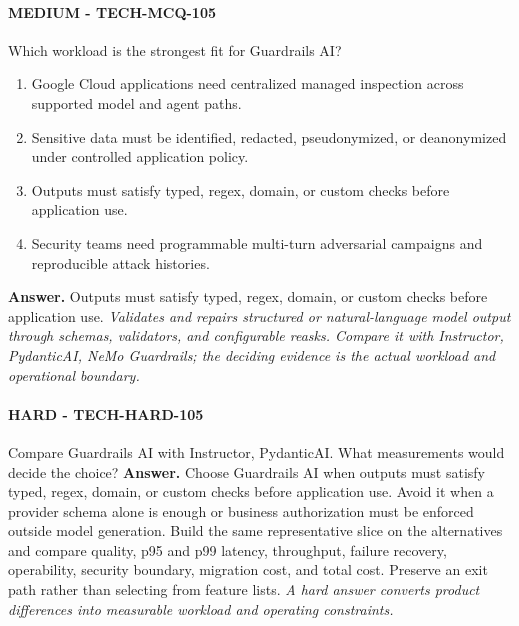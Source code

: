 \paragraph{MEDIUM - TECH-MCQ-105} Which workload is the strongest fit for Guardrails AI?
\begin{enumerate}[label=\Alph*.]
\item Google Cloud applications need centralized managed inspection across supported model and agent paths.
\item Sensitive data must be identified, redacted, pseudonymized, or deanonymized under controlled application policy.
\item Outputs must satisfy typed, regex, domain, or custom checks before application use.
\item Security teams need programmable multi-turn adversarial campaigns and reproducible attack histories.
\end{enumerate}
\textbf{Answer.} Outputs must satisfy typed, regex, domain, or custom checks before application use.
\textit{Validates and repairs structured or natural-language model output through schemas, validators, and configurable reasks. Compare it with Instructor, PydanticAI, NeMo Guardrails; the deciding evidence is the actual workload and operational boundary.}
\paragraph{HARD - TECH-HARD-105} Compare Guardrails AI with Instructor, PydanticAI. What measurements would decide the choice?
\textbf{Answer.} Choose Guardrails AI when outputs must satisfy typed, regex, domain, or custom checks before application use. Avoid it when a provider schema alone is enough or business authorization must be enforced outside model generation. Build the same representative slice on the alternatives and compare quality, p95 and p99 latency, throughput, failure recovery, operability, security boundary, migration cost, and total cost. Preserve an exit path rather than selecting from feature lists.
\textit{A hard answer converts product differences into measurable workload and operating constraints.}
